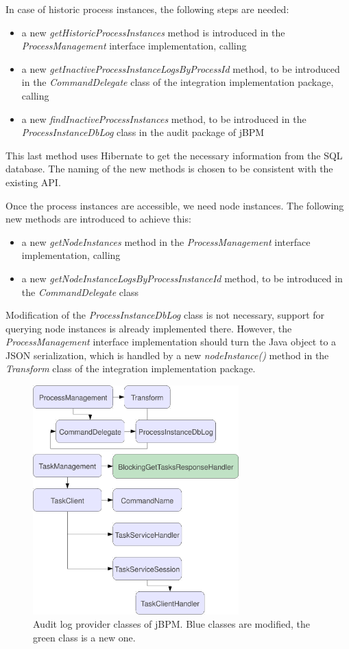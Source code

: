In case of historic process instances, the following steps are needed:


\begin{itemize}
\item a new \emph{getHistoricProcessInstances} method is introduced in the \emph{ProcessManagement} interface implementation, calling
\item a new \emph{getInactiveProcessInstanceLogsByProcessId} method, to be introduced in the \emph{CommandDelegate} class of the integration implementation package, calling
\item a new \emph{findInactiveProcessInstances} method, to be introduced in the \emph{ProcessInstanceDbLog} class in the audit package of jBPM
\end{itemize}

This last method uses Hibernate to get the necessary information from the SQL
database. The naming of the new methods is chosen to be consistent with the
existing API.

Once the process instances are accessible, we need node instances. The
following new methods are introduced to achieve this:

\begin{itemize}
\item a new \emph{getNodeInstances} method in the \emph{ProcessManagement} interface implementation, calling
\item a new \emph{getNodeInstanceLogsByProcessInstanceId} method, to be introduced in the \emph{CommandDelegate} class
\end{itemize}

Modification of the \emph{ProcessInstanceDbLog} class is not necessary, support
for querying node instances is already implemented there. However, the
\emph{ProcessManagement} interface implementation should turn the Java object
to a JSON serialization, which is handled by a new \emph{nodeInstance()} method
in the \emph{Transform} class of the integration implementation package.

\begin{figure}[p]
\centering
\includegraphics[width=300px,keepaspectratio]{jbpm-modified-classes.pdf}
\caption{Audit log provider classes of jBPM. Blue classes are modified, the green class is a new one.}
\label{fig:jbpm-modified-classes}
\end{figure}

